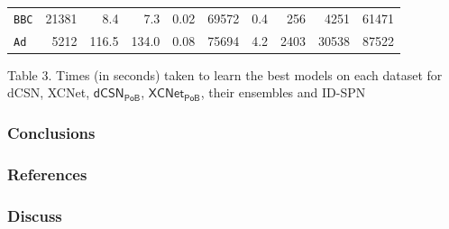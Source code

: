 \documentclass[xcolor={usenames,dvipsnames,svgnames}, compress]{beamer}
\begin{document}
\begin{frame}[t]
\begin{table}[t]
\begin{tabular}{l rrr r r r r r r}
    \texttt{BBC}&21381&8.4&7.3&	0.02&69572&0.4& 256& 4251 &61471\\ 
    \texttt{Ad}&5212&116.5&134.0&	0.08&75694&4.2&2403 & 30538 &87522\\ 
    \bottomrule
  \end{tabular}
  \label{tab:exptimes}
\end{table}
\hspace{50pt}\begin{minipage}{0.8\linewidth}
 \scriptsize Table 3. Times (in seconds) taken to learn the best models on each dataset
for \textsf{dCSN}, \textsf{XCNet}, $\mathsf{dCSN_{PoB}}$, $\mathsf{XCNet_{PoB}}$, their ensembles
and \textsf{ID-SPN}
\end{minipage}
\end{frame}

\begin{frame}[t]
  \frametitle{Conclusions}
  
\end{frame}

\begin{frame}
  \frametitle{References}
  \setlength\bibitemsep{8pt}
  \printbibliography
\end{frame}

\begin{frame}
  \frametitle{Discuss}
  
\end{frame}






  
   
\end{document}
